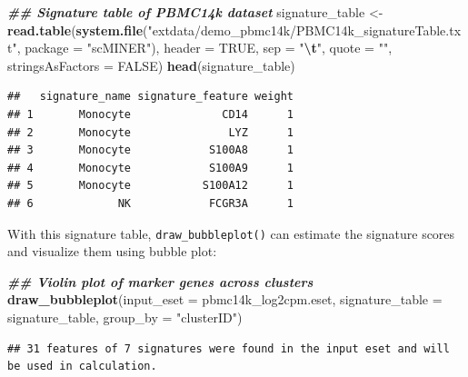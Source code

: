 \documentclass[
  12pt,
]{book}
\newenvironment{Shaded}{\begin{snugshade}}{\end{snugshade}}
\newcommand{\AttributeTok}[1]{\textcolor[rgb]{0.13,0.29,0.53}{#1}}
\newcommand{\ConstantTok}[1]{\textcolor[rgb]{0.56,0.35,0.01}{#1}}
\newcommand{\DocumentationTok}[1]{\textcolor[rgb]{0.56,0.35,0.01}{\textbf{\textit{#1}}}}
\newcommand{\FunctionTok}[1]{\textcolor[rgb]{0.13,0.29,0.53}{\textbf{#1}}}
\newcommand{\NormalTok}[1]{#1}
\newcommand{\OtherTok}[1]{\textcolor[rgb]{0.56,0.35,0.01}{#1}}
\newcommand{\SpecialCharTok}[1]{\textcolor[rgb]{0.81,0.36,0.00}{\textbf{#1}}}
\newcommand{\StringTok}[1]{\textcolor[rgb]{0.31,0.60,0.02}{#1}}
\begin{document}
\begin{Shaded}
\begin{Highlighting}[]
\DocumentationTok{\#\# Signature table of PBMC14k dataset}
\NormalTok{signature\_table }\OtherTok{\textless{}{-}} \FunctionTok{read.table}\NormalTok{(}\FunctionTok{system.file}\NormalTok{(}\StringTok{"extdata/demo\_pbmc14k/PBMC14k\_signatureTable.txt"}\NormalTok{, }\AttributeTok{package =} \StringTok{"scMINER"}\NormalTok{), }\AttributeTok{header =} \ConstantTok{TRUE}\NormalTok{, }\AttributeTok{sep =} \StringTok{"}\SpecialCharTok{\textbackslash{}t}\StringTok{"}\NormalTok{, }\AttributeTok{quote =} \StringTok{""}\NormalTok{, }\AttributeTok{stringsAsFactors =} \ConstantTok{FALSE}\NormalTok{)}
\FunctionTok{head}\NormalTok{(signature\_table)}
\end{Highlighting}
\end{Shaded}

\begin{verbatim}
##   signature_name signature_feature weight
## 1       Monocyte              CD14      1
## 2       Monocyte               LYZ      1
## 3       Monocyte            S100A8      1
## 4       Monocyte            S100A9      1
## 5       Monocyte           S100A12      1
## 6             NK            FCGR3A      1
\end{verbatim}

With this signature table, \texttt{draw\_bubbleplot()} can estimate the signature scores and visualize them using bubble plot:

\begin{Shaded}
\begin{Highlighting}[]
\DocumentationTok{\#\# Violin plot of marker genes across clusters}
\FunctionTok{draw\_bubbleplot}\NormalTok{(}\AttributeTok{input\_eset =}\NormalTok{ pbmc14k\_log2cpm.eset, }\AttributeTok{signature\_table =}\NormalTok{ signature\_table, }\AttributeTok{group\_by =} \StringTok{"clusterID"}\NormalTok{)}
\end{Highlighting}
\end{Shaded}

\begin{verbatim}
## 31 features of 7 signatures were found in the input eset and will be used in calculation.
\end{verbatim}
\end{document}
